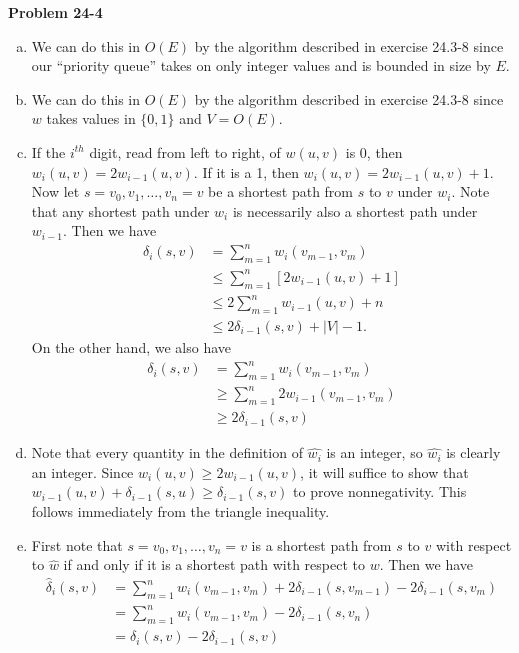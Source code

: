 \documentclass{article}
\begin{document}
\noindent\textbf{Problem 24-4}\\
\begin{enumerate}[a.]
\item We can do this in $O(E)$ by the algorithm described in exercise 24.3-8 since our ``priority queue'' takes on only integer values and is bounded in size by $E$.\\

\item We can do this in $O(E)$ by the algorithm described in exercise 24.3-8 since $w$ takes values in $\{0,1\}$ and $V = O(E)$. \\

\item If the $i^{th}$ digit, read from left to right, of $w(u,v)$ is 0, then $w_i(u,v) = 2w_{i-1}(u,v)$.  If it is a 1, then $w_i(u,v) = 2w_{i-1}(u,v)+1$.  Now let $s = v_0, v_1, \ldots, v_n = v$ be a shortest path from $s$ to $v$ under $w_i$.  Note that any shortest path under $w_i$ is necessarily also a shortest path under $w_{i-1}$.  Then we have
\begin{align*}
\delta_i(s,v) &= \sum_{m=1}^n w_i(v_{m-1}, v_m) \\
&\leq  \sum_{m=1}^n [2w_{i-1}(u,v) + 1] \\
&\leq 2\sum_{m=1}^n w_{i-1}(u,v) + n \\
&\leq 2\delta_{i-1}(s,v) + |V| - 1.
\end{align*}
On the other hand, we also have 
\begin{align*}
\delta_i(s,v) &= \sum_{m=1}^n w_i(v_{m-1}, v_m) \\
&\geq \sum_{m=1}^n 2w_{i-1}(v_{m-1}, v_m) \\
&\geq 2\delta_{i-1}(s,v)
\end{align*}

\item Note that every quantity in the definition of $\hat{w_i}$ is an integer, so $\hat{w_i}$ is clearly an integer.  Since $w_i(u,v) \geq 2w_{i-1}(u,v)$, it will suffice to show that $w_{i-1}(u,v) + \delta_{i-1}(s,u) \geq \delta_{i-1}(s,v)$ to prove nonnegativity.  This follows immediately from the triangle inequality. \\

\item First note that $s=v_0, v_1, \ldots, v_n = v$ is a shortest path from $s$ to $v$ with respect to $\hat{w}$ if and only if it is a shortest path with respect to $w$.  Then we have
\begin{align*}
\hat{\delta}_i(s,v) &= \sum_{m=1}^n w_i(v_{m-1}, v_m) + 2\delta_{i-1}(s,v_{m-1}) - 2\delta_{i-1}(s, v_m) \\
&=  \sum_{m=1}^n w_i(v_{m-1}, v_m) - 2\delta_{i-1}(s,v_n) \\
&= \delta_i(s,v) - 2\delta_{i-1}(s,v)
\end{align*}



\end{enumerate}
\end{document}
